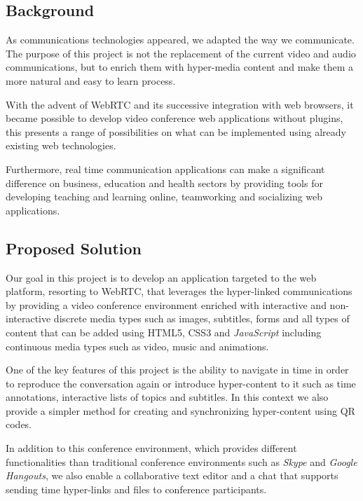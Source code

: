 \documentclass[conference,compsoc,a4paper]{IEEEtran}
\begin{document}
\subsection{Background}
\label{section:background}

	As communications technologies appeared, we adapted the way we communicate. The purpose of this project is not the replacement of the current video and audio communications, but to enrich them with hyper-media content and make them a more natural and easy to learn process. 

	With the advent of WebRTC and its successive integration with web browsers, it became possible to develop video conference web applications without plugins, this presents a range of possibilities on what can be implemented using already existing web technologies.
		
    Furthermore, real time communication applications can make a significant difference on business, education and health sectors by providing tools for developing teaching and learning online, teamworking and socializing web applications.

\subsection{Proposed Solution}
\label{section:proposed}

	Our goal in this project is to develop an application targeted to the web platform, resorting to \gls{WebRTC}, that leverages the hyper-linked communications by providing a video conference environment enriched with interactive and non-interactive discrete media types such as images, subtitles, forms and all types of content that can be added using \gls{HTML}5, \gls{CSS}3 and \emph{JavaScript} including continuous media types such as video, music and animations.

	One of the key features of this project is the ability to navigate in time in order to reproduce the conversation again or introduce hyper-content to it such as time annotations, interactive lists of topics and subtitles. In this context we also provide a simpler method for creating and synchronizing hyper-content using \gls{QR} codes.

	In addition to this conference environment, which provides different functionalities than traditional conference environments such as \emph{Skype} and \emph{Google Hangouts}, we also enable a collaborative text editor and a chat that supports sending time hyper-links and files to conference participants.
\end{document}
